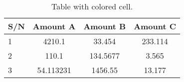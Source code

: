 \documentclass{article}
\begin{document}
	
	\begin{table}[h!]
		\begin{center}
			\caption{Table with colored cell.}
			\label{tab:table1}
			\begin{tabular}{l|c|c|c|}
				\hline
				\textbf{S/N} & \textbf{Amount A} & {Amount B} & {Amount C}\\
				\hline
				\cellcolor{blue!25}1 & 4210.1 & 33.454 & 233.114\\
				\cellcolor{green!20}2 & 110.1 & 134.5677 & 3.565\\
				\cellcolor{red!35}3 & 54.113231 & 1456.55 & 13.177\\
				\hline
			\end{tabular}
		\end{center}
	\end{table}   
\end{document}
